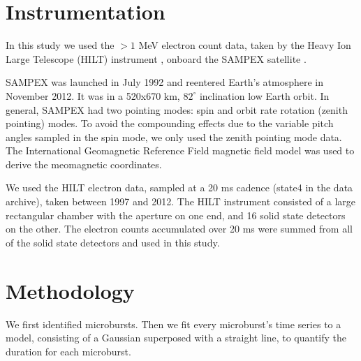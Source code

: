 \documentclass[draft]{agujournal2019}
\begin{document}
\section{Instrumentation}\label{instrumentation}
In this study we used the $>1$ MeV electron count data, taken by the Heavy Ion Large Telescope (HILT) instrument \cite{Klecker1993}, onboard the SAMPEX satellite \cite{Baker1993}.

SAMPEX was launched in July 1992 and reentered Earth's atmosphere in November 2012. It was in a 520x670 km, $82^\circ$ inclination low Earth orbit. In general, SAMPEX had two pointing modes: spin and orbit rate rotation (zenith pointing) modes. To avoid the compounding effects due to the variable pitch angles sampled in the spin mode, we only used the zenith pointing mode data. The International Geomagnetic Reference Field \cite[IGRF]{Thebault2015} magnetic field model was used to derive the meomagnetic coordinates.

We used the HILT electron data, sampled at a 20 ms cadence (state4 in the data archive), taken between 1997 and 2012. The HILT instrument consisted of a large rectangular chamber with the aperture on one end, and 16 solid state detectors on the other. The electron counts accumulated over 20 ms were summed from all of the solid state detectors and used in this study.

\section{Methodology}\label{methodology}

We first identified microbursts. Then we fit every microburst's time series to a model, consisting of a Gaussian superposed with a straight line, to quantify the duration for each microburst.
\end{document}
